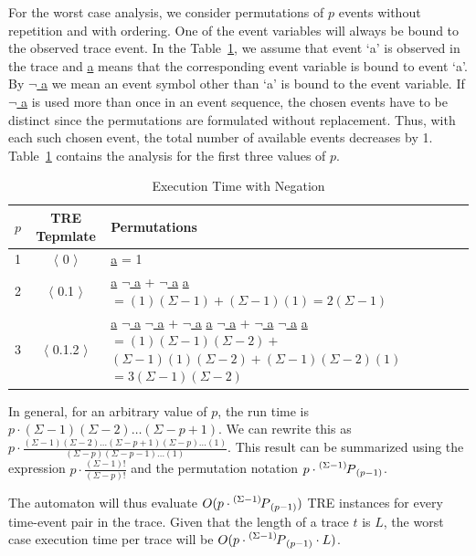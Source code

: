 \documentclass[]{sigplanconf}
\newcommand\Myperm[2][n]{\prescript{#1\mkern-2.5mu}{}P_{#2}}
\begin{document}
For the worst case analysis, we consider permutations of $p$ events without repetition and with ordering. One of the event variables will always be bound to the observed trace event. In the Table~\ref{Exec-noneg}, we assume that event `a' is observed in the trace and \underline{a} means that the corresponding event variable is bound to event `a'. By \underline{$\neg$ a} we mean an event symbol other than `a' is bound to the event variable. If \underline{$\neg$ a} is used more than once in an event sequence, the chosen events have to be distinct since the permutations are formulated without replacement. Thus, with each such chosen event, the total number of available events decreases by 1. Table~\ref{Exec-noneg} contains the analysis for the first three values of $p$.

\begin{table}[ht]
  \centering
  \begin{tabular}{|c|c|l|}
    \hline
    \textbf{$p$} & \textbf{TRE Tepmlate} & \textbf{Permutations}\\
    \hline
      1 & $\langle$ 0 $\rangle$ & \underline{a} = 1 \\
    \hline
      2 & $\langle$ 0.1 $\rangle$ &
      \makecell[l]{\underline{a} \underline{$\neg$ a} + \underline{$\neg$ a} \underline{a} \\
      $= (1)(\Sigma - 1) + (\Sigma - 1)(1) = 2(\Sigma - 1)$ } \\
    \hline
      3 & $\langle$ 0.1.2 $\rangle$ &
      \makecell[l]{\underline{a} \underline{$\neg$ a} \underline{$\neg$ a} + \underline{$\neg$ a} \underline{a} \underline{$\neg$ a} + \underline{$\neg$ a} \underline{$\neg$ a} \underline{a} \\
      $= (1)(\Sigma - 1)(\Sigma - 2) +$ \\
      $(\Sigma - 1)(1)(\Sigma - 2) + (\Sigma - 1)(\Sigma - 2)(1) $ \\
      $= 3(\Sigma - 1)(\Sigma - 2) $ } \\
    \hline
  \end{tabular}
\caption{Execution Time with Negation} \label{Exec-noneg}
\end{table}

\begin{sloppypar}
In general, for an arbitrary value of $p$, the run time is ${p \cdot (\Sigma - 1)(\Sigma - 2) \ldots (\Sigma - p + 1)}$.
We can rewrite this as
${p \cdot \frac{(\Sigma - 1)(\Sigma - 2) \ldots (\Sigma - p + 1)(\Sigma - p) \ldots (1)}{(\Sigma - p)(\Sigma - p - 1) \ldots (1)}}$.
This result can be summarized using the expression ${p \cdot \frac{(\Sigma - 1)!}{(\Sigma - p)!}}$ and the permutation notation ${p \cdot \Myperm[(\Sigma - 1)]{(p - 1)}}$.

The automaton will thus evaluate $O(p \cdot \Myperm[(\Sigma - 1)]{(p - 1)})$ TRE instances for every time-event pair in the trace. Given that the length of a trace $t$ is $L$, the worst case execution time per trace will be
$O(p \cdot \Myperm[(\Sigma - 1)]{(p - 1)} \cdot L)$.
\end{sloppypar}
\end{document}
